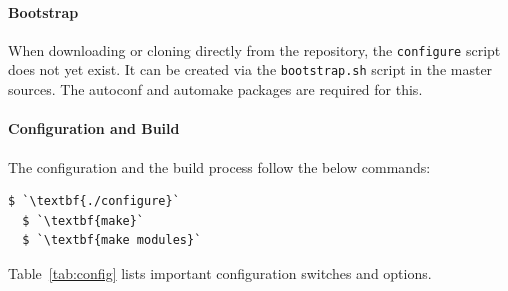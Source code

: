 \documentclass[a4paper,12pt,BCOR6mm,bibtotoc,idxtotoc]{scrbook}
\begin{document}
\paragraph{Bootstrap} When downloading or cloning directly from the
repository, the \lstinline+configure+ script does not yet exist. It can be
created via the \lstinline+bootstrap.sh+ script in the master sources. The
autoconf and automake packages are required for this.

\paragraph{Configuration and Build} The configuration and the build process
follow the below commands:

\begin{lstlisting}[gobble=2]
  $ `\textbf{./configure}`
  $ `\textbf{make}`
  $ `\textbf{make modules}`
\end{lstlisting}

Table~\ref{tab:config} lists important configuration switches and options.
\end{document}
